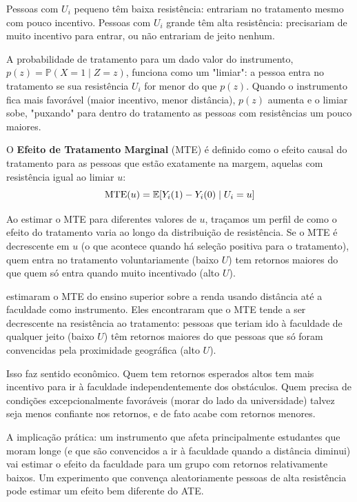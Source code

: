 Pessoas com $U_i$ pequeno têm baixa resistência: entrariam no tratamento mesmo com pouco incentivo. Pessoas com $U_i$ grande têm alta resistência: precisariam de muito incentivo para entrar, ou não entrariam de jeito nenhum.

A probabilidade de tratamento para um dado valor do instrumento, $p(z) = \mathbb{P}(X=1 \mid Z=z)$, funciona como um "limiar": a pessoa entra no tratamento se sua resistência $U_i$ for menor do que $p(z)$. Quando o instrumento fica mais favorável (maior incentivo, menor distância), $p(z)$ aumenta e o limiar sobe, "puxando" para dentro do tratamento as pessoas com resistências um pouco maiores.

O \textbf{Efeito de Tratamento Marginal} (MTE) é definido como o efeito causal do tratamento para as pessoas que estão exatamente na margem, aquelas com resistência igual ao limiar $u$:
\begin{equation}
\text{MTE}(u) = \mathbb{E}[Y_i(1) - Y_i(0) \mid U_i = u]
\label{eq:mte}
\end{equation}

Ao estimar o MTE para diferentes valores de $u$, traçamos um perfil de como o efeito do tratamento varia ao longo da distribuição de resistência. Se o MTE é decrescente em $u$ (o que acontece quando há seleção positiva para o tratamento), quem entra no tratamento voluntariamente (baixo $U$) tem retornos maiores do que quem só entra quando muito incentivado (alto $U$).

\begin{exemplobox}
\citet{HeckmanVytlacil2005} estimaram o MTE do ensino superior sobre a renda usando distância até a faculdade como instrumento. Eles encontraram que o MTE tende a ser decrescente na resistência ao tratamento: pessoas que teriam ido à faculdade de qualquer jeito (baixo $U$) têm retornos maiores do que pessoas que só foram convencidas pela proximidade geográfica (alto $U$).

Isso faz sentido econômico. Quem tem retornos esperados altos tem mais incentivo para ir à faculdade independentemente dos obstáculos. Quem precisa de condições excepcionalmente favoráveis (morar do lado da universidade) talvez seja menos confiante nos retornos, e de fato acabe com retornos menores.

A implicação prática: um instrumento que afeta principalmente estudantes que moram longe (e que são convencidos a ir à faculdade quando a distância diminui) vai estimar o efeito da faculdade para um grupo com retornos relativamente baixos. Um experimento que convença aleatoriamente pessoas de alta resistência pode estimar um efeito bem diferente do ATE.
\end{exemplobox}

